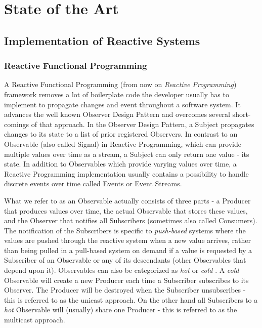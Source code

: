 \chapter{State of the Art} \label{chap:State of the Art}

\section{Implementation of Reactive Systems}
	\subsection{Reactive Functional Programming}
	A Reactive Functional Programming (from now on \emph{Reactive Programming}) framework removes a lot of boilerplate code the developer usually has to implement to propagate changes and event throughout a software system. It advances the well known Observer Design Pattern and overcomes several short-comings of that approach. In the Observer Design Pattern, a Subject propagates changes to its state to a list of prior registered Observers. In contrast to an Observable (also called Signal) in Reactive Programming, which can provide multiple values over time as a stream, a Subject can only return one value - its state.
	In addition to Observables which provide varying values over time, a Reactive Programming implementation usually contains a possibility to handle discrete events over time called Events or Event Streams\cite{BaconJS}.
	
	What we refer to as an Observable actually consists of three parts - a Producer that produces values over time, the actual Observable that stores these values, and the Observer that notifies all Subscribers (sometimes also called Consumers). The notification of the Subscribers is specific to \emph{push-based} systems where the values are pushed through the reactive system when a new value arrives, rather than being pulled in a pull-based system on demand if a value is requested by a Subscriber of an Observable or any of its descendants (other Observables that depend upon it).
	Observables can also be categorized as \emph{hot} or \emph{cold} \cite{HotVsCold}. A \emph{cold} Observable will create a new Producer each time a Subscriber subscribes to its Observer. The Producer will be destroyed when the Subscriber unsubscribes - this is referred to as the unicast approach. On the other hand all Subscribers to a \emph{hot} Observable will (usually) share one Producer - this is referred to as the multicast approach.
	
